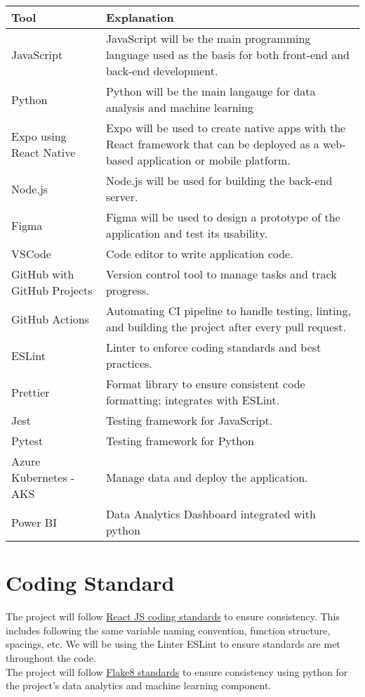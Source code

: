 \documentclass{article}
\begin{document}
\begin{tabularx}{\textwidth}{|X|X|}
  \hline
  \textbf{Tool} & \textbf{Explanation} \\
  \hline
  JavaScript & JavaScript will be the main programming language used as the basis for both front-end and back-end development.\\
  \hline
  Python & Python will be the main langauge for data analysis and machine learning \\ 
  \hline
  Expo using React Native & Expo will be used to create native apps with the React framework that can be deployed as a web-based application or mobile platform. \\
  \hline
  Node.js & Node.js will be used for building the back-end server. \\
  \hline
  Figma & Figma will be used to design a prototype of the application and test its usability. \\
  \hline
  VSCode & Code editor to write application code. \\
  \hline
  GitHub with GitHub Projects & Version control tool to manage tasks and track progress. \\
  \hline
  GitHub Actions & Automating CI pipeline to handle testing, linting, and building the project after every pull request. \\
  \hline
  ESLint & Linter to enforce coding standards and best practices. \\
  \hline
  Prettier & Format library to ensure consistent code formatting; integrates with ESLint. \\
  \hline
  Jest & Testing framework for JavaScript. \\
  \hline
  Pytest & Testing framework for Python \\ 
  \hline
  Azure Kubernetes - AKS & Manage data and deploy the application. \\
  \hline
  Power BI &  Data Analytics Dashboard integrated with python \\
  \hline
\end{tabularx}

\pagebreak

\section{Coding Standard}

The project will follow \href{https://github.com/pillarstudio/standards/blob/master/reactjs-guidelines.md}{React JS coding standards} to ensure consistency. This includes following the same variable naming convention, function structure, spacings, etc. We will be using the Linter ESLint to ensure standards are met throughout the code.\\
The project will follow \href{https://flake8.pycqa.org/en/latest/}{Flake8 standards} to ensure consistency using python for the project's data analytics and machine learning component. 
\end{document}
